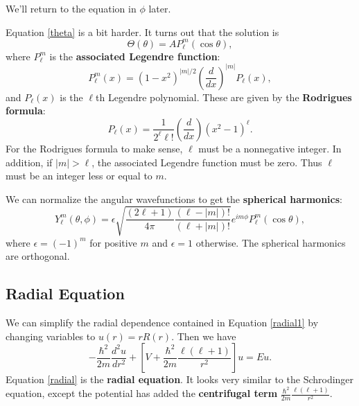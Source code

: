 We'll return to the equation in $\phi$ later.

Equation \ref{theta} is a bit harder. It turns out that the solution is 
\begin{equation}
    \Theta (\theta) = AP_\ell^m (\cos \theta),
\end{equation}
where $P_\ell^m$ is the \textbf{associated Legendre function}:
\begin{equation}
    P_\ell^m (x) = (1-x^2)^{|m|/2} \left(\frac{d}{dx} \right)^{|m|} P_\ell (x),
\end{equation}
and $P_\ell(x)$ is the $\ell$th Legendre polynomial. These are given by the \textbf{Rodrigues formula}:
\begin{equation}
    P_\ell (x) = \frac{1}{2^\ell \ell !} \left( \frac{d}{dx}\right) (x^2-1)^\ell.
\end{equation}
For the Rodrigues formula to make sense, $\ell$ must be a nonnegative integer. In addition, if $|m| > \ell$, the associated Legendre function must be zero. Thus $\ell$ must be an integer less or equal to $m$.

We can normalize the angular wavefunctions to get the \textbf{spherical harmonics}:
\begin{equation}
Y_\ell^m (\theta, \phi) = \epsilon \sqrt{\frac{(2\ell+1)}{4\pi} \frac{(\ell-|m|)!}{(\ell+|m|)!}} e^{im\phi} P_\ell^m (\cos \theta),
    \label{sphericalHarmonics}
\end{equation}
where $\epsilon = (-1)^m$ for positive $m$ and $\epsilon =1$ otherwise. The spherical harmonics are orthogonal.
\subsection{Radial Equation}
We can simplify the radial dependence contained in Equation \ref{radial1} by changing variables to $u(r) = r R(r)$. Then we have 
\begin{equation}
    -\frac{\hbar^2}{2m} \frac{d^2u}{dr^2} + \left[V+\frac{\hbar^2}{2m}\frac{\ell(\ell+1)}{r^2} \right] u  = Eu.\label{radial}
\end{equation}
Equation \ref{radial} is the \textbf{radial equation}. It looks very similar to the Schrodinger equation, except the potential has added the \textbf{centrifugal term} $\frac{\hbar^2}{2m}\frac{\ell(\ell+1)}{r^2}$.
